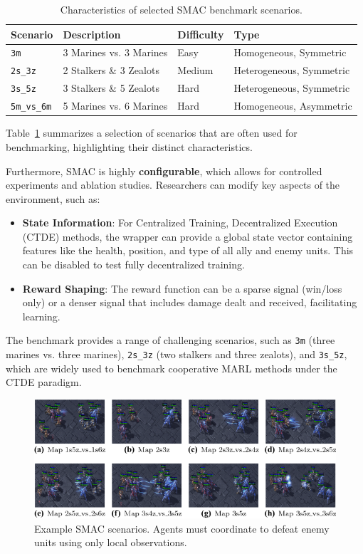 \documentclass[../Main.tex]{subfiles}
\begin{document}
\begin{table}[H]
    \centering
    \begin{tabular}{@{}llll@{}}
        \toprule
        \textbf{Scenario} & \textbf{Description} & \textbf{Difficulty} & \textbf{Type} \\ \midrule
        \texttt{3m} & 3 Marines vs. 3 Marines & Easy & Homogeneous, Symmetric \\
        \texttt{2s\_3z} & 2 Stalkers \& 3 Zealots & Medium & Heterogeneous, Symmetric \\
        \texttt{3s\_5z} & 3 Stalkers \& 5 Zealots & Hard & Heterogeneous, Symmetric \\
        \texttt{5m\_vs\_6m} & 5 Marines vs. 6 Marines & Hard & Homogeneous, Asymmetric \\ \bottomrule
    \end{tabular}
    \caption{Characteristics of selected SMAC benchmark scenarios.}    
    \label{tab:smac_scenarios}
\end{table}

Table~\ref{tab:smac_scenarios} summarizes a selection of scenarios that are often used for benchmarking, highlighting their distinct characteristics.

Furthermore, SMAC is highly \textbf{configurable}, which allows for controlled experiments and ablation studies. Researchers can modify key aspects of the environment, such as:
\begin{itemize}
    \item \textbf{State Information}: For Centralized Training, Decentralized Execution (CTDE) methods, the wrapper can provide a global state vector containing features like the health, position, and type of all ally and enemy units. This can be disabled to test fully decentralized training.
    \item \textbf{Reward Shaping}: The reward function can be a sparse signal (win/loss only) or a denser signal that includes damage dealt and received, facilitating learning.
\end{itemize}

The benchmark provides a range of challenging scenarios, such as \texttt{3m} (three marines vs. three marines), \texttt{2s\_3z} (two stalkers and three zealots), and \texttt{3s\_5z}, which are widely used to benchmark cooperative MARL methods under the CTDE paradigm.

\begin{figure}[H]
    \centering
    \includegraphics[width=\linewidth]{img/smac_maps.png}
    \caption{Example SMAC scenarios. Agents must coordinate to defeat enemy units using only local observations.}
    \label{fig:smac}
\end{figure}
\end{document}
